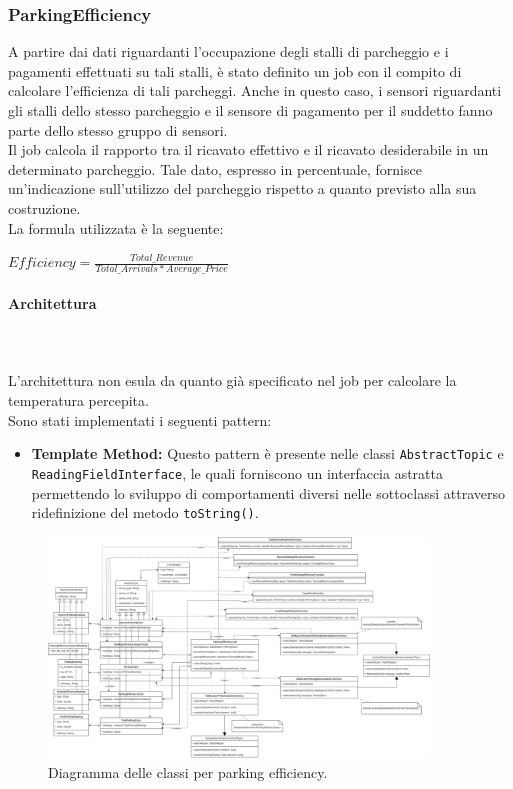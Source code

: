 \documentclass[8pt]{article}
\newcommand{\subsubsubsection}[1]{\paragraph{#1}\mbox{}\\\\}
\begin{document}
\subsubsection{ParkingEfficiency}
A partire dai dati riguardanti l'occupazione degli stalli di parcheggio e i pagamenti effettuati su tali stalli, è stato definito un job con il compito di calcolare l'efficienza di tali parcheggi. Anche in questo caso, i sensori riguardanti gli stalli dello stesso parcheggio e il sensore di pagamento per il suddetto fanno parte dello stesso gruppo di sensori.
\\Il job calcola il rapporto tra il ricavato effettivo e il ricavato desiderabile in un determinato parcheggio. Tale dato, espresso in percentuale, fornisce un'indicazione sull'utilizzo del parcheggio rispetto a quanto previsto alla sua costruzione.\\La formula utilizzata è la seguente:
\begin{center}
    $Efficiency = \frac{Total\_Revenue}{Total\_Arrivals * Average\_Price}$
\end{center}
\subsubsubsection{Architettura}
L'architettura non esula da quanto già specificato nel job per calcolare la temperatura percepita.
\\Sono stati implementati i seguenti pattern:
\begin{itemize}
    \item \textbf{Template Method:}
    Questo pattern è presente nelle classi \verb|AbstractTopic| e \verb|ReadingFieldInterface|, le quali forniscono un interfaccia astratta permettendo lo sviluppo di comportamenti diversi nelle sottoclassi attraverso ridefinizione del metodo \verb|toString()|.
\end{itemize}
\begin{figure}[h!]
    \centering
    \includegraphics[width=0.9\textwidth]{images_st/parkingefficiencyjob.png}
    \caption{Diagramma delle classi per parking efficiency.}
    \label{fig:Diagramma delle classi per parking efficiency}
\end{figure}
\end{document}
